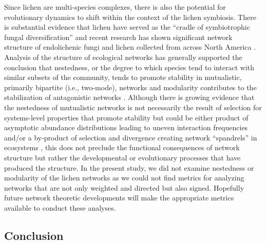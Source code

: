 \documentclass[fleqn,12pt]{olplainarticle}
\begin{document}
Since lichen are multi-species complexes, there is also the potential
for evolutionary dynamics to shift within the context of the lichen
symbiosis. There is substantial evidence that lichen have served as
the ``cradle of symbiotrophic fungal diversification''
\citep{Arnold2009ADiversification} and recent research has shown
significant network structure of endolichenic fungi and lichen
collected from across North America
\citep{Chagnon2016InteractionScale}. Analysis of the structure of
ecological networks has generally supported the conclusion that
nestedness, or the degree to which species tend to interact with
similar subsets of the community, tends to promote stability in
mutualistic, primarily bipartite (i.e., two-mode), networks and
modularity contributes to the stabilization of antagonistic networks
\citep{Elias2013EvolutionaryNetwork,
  Grilli2016ModularityCommunities}. Although there is growing evidence
that the nestedness of mutualistic networks is not necessarily the
result of selection for systems-level properties that promote
stability but could be either product of asymptotic abundance
distributions leading to uneven interaction frequencies
\citep{Staniczenko2013TheNetworks} and/or a by-product of selection and
divergence creating network ``spandrels'' in ecosystems
\citep{Valverde2018TheSpandrel}, this does not preclude the functional
consequences of network structure but rather the developmental or
evolutionary processes that have produced the structure. In the
present study, we did not examine nestedness or modularity of the
lichen networks as we could not find metrics for analyzing networks
that are not only weighted and directed but also signed. Hopefully
future network theoretic developments will make the appropriate
metrics available to conduct these analyses.


\subsection*{Conclusion}
\end{document}

